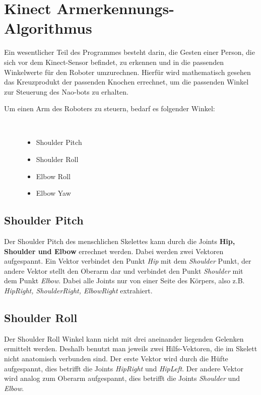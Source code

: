 \section{Kinect Armerkennungs-Algorithmus}
Ein wesentlicher Teil des Programmes besteht darin, die Gesten einer Person, die sich vor dem Kinect-Sensor befindet, zu erkennen und in die passenden Winkelwerte für den Roboter umzurechnen.
Hierfür wird mathematisch gesehen das Kreuzprodukt der passenden Knochen errechnet, um die passenden Winkel zur Steuerung des Nao-bots zu erhalten.

\begin{description}
	\item[Um einen Arm des Roboters zu steuern, bedarf es folgender Winkel:]~\par
	\begin{itemize}
		\item Shoulder Pitch
		\item Shoulder Roll
		\item Elbow Roll
		\item Elbow Yaw
	\end{itemize}
\end{description}

\subsection{Shoulder Pitch}
Der Shoulder Pitch des menschlichen Skelettes kann durch die Joints \textbf{Hip, Shoulder und Elbow} errechnet werden. Dabei werden zwei Vektoren aufgespannt. Ein Vektor verbindet den Punkt \textit{Hip} mit dem \textit{Shoulder} Punkt, der andere Vektor stellt den Oberarm dar und verbindet den Punkt \textit{Shoulder} mit dem Punkt \textit{Elbow}. Dabei alle Joints nur von einer Seite des Körpers, also z.B. \textit{HipRight, ShoulderRight, ElbowRight} extrahiert.


\subsection{Shoulder Roll}
Der Shoulder Roll Winkel kann nicht mit drei aneinander liegenden Gelenken ermittelt werden. Deshalb benutzt man jeweils zwei Hilfs-Vektoren, die im Skelett nicht anatomisch verbunden sind. Der erste Vektor wird durch die Hüfte aufgespannt, dies betrifft die Joints \textit{HipRight} und \textit{HipLeft}. Der andere Vektor wird analog zum Oberarm aufgespannt, dies betrifft die Joints \textit{Shoulder} und \textit{Elbow}.

